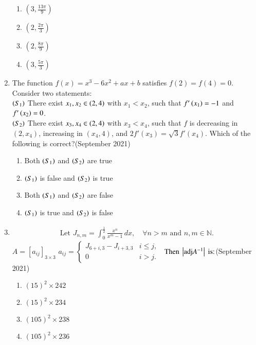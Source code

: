 \documentclass[journal,12pt,onecolumn]{IEEEtran}
\theoremstyle{remark}
\begin{document}
\begin{enumerate}
\begin{multicols}{4}
\begin{enumerate}
    \item $(3, \frac{13\pi}{9})$
    \item $(2, \frac{2\pi}{3})$
    \item $(2, \frac{8\pi}{9})$
    \item $(3, \frac{5\pi}{3})$
\end{enumerate}
\end{multicols}
\item The function $f(x) = x^3 - 6x^2 + ax + b$ satisfies $f(2) = f(4) = 0$. Consider two statements:\\[10pt]
$\left(S_1\right)$ There exist $x_1, x_2 \in \left(2, 4\right)$ with $x_1 < x_2$, such that $f'\left(x_1\right) = -1$ and $f'\left(x_2\right) = 0$.\\[10pt]
$\left(S_2\right)$ There exist $x_3, x_4 \in \left(2, 4\right)$ with $x_3 < x_4$, such that $f$ is decreasing in $(2, x_4)$, increasing in $(x_4, 4)$, and $2f'(x_3) = \sqrt{3}f'(x_4)$.
Which of the following is correct?\hfill (September 2021)
\begin{multicols}{2}
\begin{enumerate}
    \item Both $\left(S_1\right)$ and $\left(S_2\right)$  are true
    \item $\left(S_1\right)$ is false and $\left(S_2\right)$  is true
    \item Both $\left(S_1\right)$ and $\left(S_2\right)$ are false
    \item $\left(S_1\right)$ is true and $\left(S_2\right)$ is false
\end{enumerate}
\end{multicols}

\item \begin{align*}
\text{ Let } J_{n,m} =  \int_0^\frac{1}{2} \frac{x^n}{x^m - 1} \, dx, \quad \forall n > m \text{ and } n, m \in \mathbb{N}.
\end{align*}
 $A = [a_{ij}]_{3 \times 3}$ 
$a_{ij} = 
\begin{cases}
   J_{6+i, 3} - J_{i+3, 3} & i \leq j,\\
    0 & i > j.
    \end{cases}$
$\text{ Then } \left\vert\text{adj}A^{-1}\right\vert  \text{ is:}$\hfill (September 2021)
    
\begin{multicols}{2}
\begin{enumerate}
    \item $(15)^2 \times 242$\\
    \item $(15)^2 \times 234$
    \item $(105)^2 \times 238$\\
    \item $(105)^2 \times 236$
\end{enumerate}
\end{multicols}


\end{enumerate}
\end{document}
